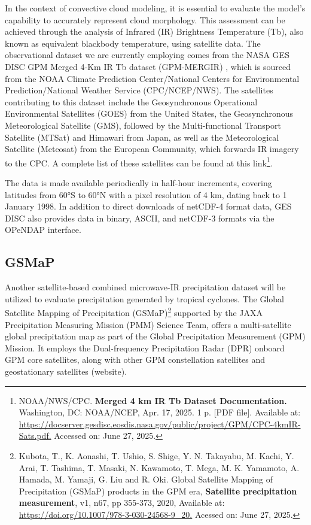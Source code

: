 In the context of convective cloud modeling, it is essential to evaluate the model's capability to accurately represent cloud morphology. This assessment can be achieved through the analysis of Infrared (IR) Brightness Temperature (Tb), also known as equivalent blackbody temperature, using satellite data. The observational dataset we are currently employing comes from the NASA GES DISC GPM Merged 4-Km IR Tb dataset (GPM-MERGIR) \cite{janowiak2017ncep}, which is sourced from the NOAA Climate Prediction Center/National Centers for Environmental Prediction/National Weather Service (CPC/NCEP/NWS). The satellites contributing to this dataset include the Geosynchronous Operational Environmental Satellites (GOES) from the United States, the Geosynchronous Meteorological Satellite (GMS), followed by the Multi-functional Transport Satellite (MTSat) and Himawari from Japan, as well as the Meteorological Satellite (Meteosat) from the European Community, which forwards IR imagery to the CPC. A complete list of these satellites can be found at this link\footnote{NOAA/NWS/CPC. \textbf{Merged 4 km IR Tb Dataset Documentation.} Washington, DC: NOAA/NCEP, Apr. 17, 2025. 1 p. [PDF file]. Available at: \url{https://docserver.gesdisc.eosdis.nasa.gov/public/project/GPM/CPC-4kmIR-Sats.pdf.} Accessed on: June 27, 2025.}.

The data is made available periodically in half-hour increments, covering latitudes from 60°S to 60°N with a pixel resolution of 4 km, dating back to 1 January 1998. In addition to direct downloads of netCDF-4 format data, GES DISC also provides data in binary, ASCII, and netCDF-3 formats via the OPeNDAP interface.

\subsection{GSMaP}
\label{section315}

Another satellite-based combined microwave-IR precipitation dataset will be utilized to evaluate precipitation generated by tropical cyclones. The Global Satellite Mapping of Precipitation (GSMaP)\footnote{Kubota, T., K. Aonashi, T. Ushio, S. Shige, Y. N. Takayabu, M. Kachi, Y. Arai, T. Tashima, T. Masaki, N. Kawamoto, T. Mega, M. K. Yamamoto, A. Hamada, M. Yamaji, G. Liu and R. Oki. Global Satellite Mapping of Precipitation (GSMaP) products in the GPM era, \textbf{Satellite precipitation measurement}, v1, n67, pp 355-373, 2020, Available at: \url{https://doi.org/10.1007/978-3-030-24568-9_20.} Acessed on: June 27, 2025.}
supported by the JAXA Precipitation Measuring Mission (PMM) Science Team, offers a multi-satellite global precipitation map as part of the Global Precipitation Measurement (GPM) Mission. It employs the Dual-frequency Precipitation Radar (DPR) onboard GPM core satellites, along with other GPM constellation satellites and geostationary satellites (website).

